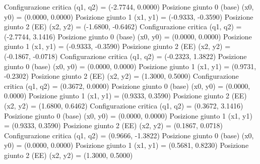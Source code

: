\documentclass[11pt, a4paper]{article}
\begin{document}
\begin{matlaboutput}
Configurazione critica (q1, q2) = (-2.7744, 0.0000)
	 Posizione giunto 0 (base) (x0, y0) = (0.0000, 0.0000)
	 Posizione giunto 1        (x1, y1) = (-0.9333, -0.3590)
	 Posizione giunto 2 (EE)   (x2, y2) = (-1.6800, -0.6462)
Configurazione critica (q1, q2) = (-2.7744, 3.1416)
	 Posizione giunto 0 (base) (x0, y0) = (0.0000, 0.0000)
	 Posizione giunto 1        (x1, y1) = (-0.9333, -0.3590)
	 Posizione giunto 2 (EE)   (x2, y2) = (-0.1867, -0.0718)
Configurazione critica (q1, q2) = (-0.2323, 1.3822)
	 Posizione giunto 0 (base) (x0, y0) = (0.0000, 0.0000)
	 Posizione giunto 1        (x1, y1) = (0.9731, -0.2302)
	 Posizione giunto 2 (EE)   (x2, y2) = (1.3000, 0.5000)
Configurazione critica (q1, q2) = (0.3672, 0.0000)
	 Posizione giunto 0 (base) (x0, y0) = (0.0000, 0.0000)
	 Posizione giunto 1        (x1, y1) = (0.9333, 0.3590)
	 Posizione giunto 2 (EE)   (x2, y2) = (1.6800, 0.6462)
Configurazione critica (q1, q2) = (0.3672, 3.1416)
	 Posizione giunto 0 (base) (x0, y0) = (0.0000, 0.0000)
	 Posizione giunto 1        (x1, y1) = (0.9333, 0.3590)
	 Posizione giunto 2 (EE)   (x2, y2) = (0.1867, 0.0718)
Configurazione critica (q1, q2) = (0.9666, -1.3822)
	 Posizione giunto 0 (base) (x0, y0) = (0.0000, 0.0000)
	 Posizione giunto 1        (x1, y1) = (0.5681, 0.8230)
	 Posizione giunto 2 (EE)   (x2, y2) = (1.3000, 0.5000)
\end{matlaboutput}
\newpage
\end{document}
